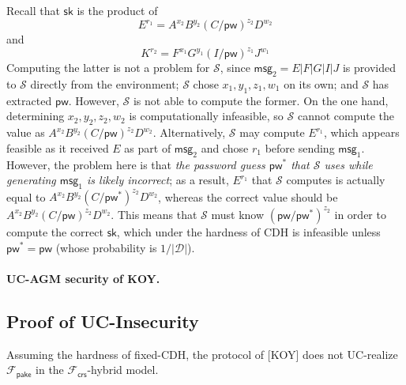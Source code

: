 \documentclass[12pt,a4paper]{article}
\newcommand{\simulator}{\mathcal{S}}
\newcommand{\sk}{\mathsf{sk}}
\newcommand{\pw}{\mathsf{pw}}
\newcommand{\msg}[1]{\mathsf{msg}_{#1}}
\begin{document}
Recall that $\sk$ is the product of
\[
E^{r_1} = A^{x_2}B^{y_2}(C/\pw)^{z_2}D^{w_2}
\]
and
\[
K^{r_2} = F^{x_1}G^{y_1}(I/\pw)^{z_1}J^{w_1}
\]
Computing the latter is not a problem for $\simulator$, since $\msg{2} = E|F|G|I|J$ is provided to $\simulator$ directly from the environment; $\simulator$ chose $x_1, y_1, z_1, w_1$ on its own; and $\simulator$ has extracted $\pw$. However, $\simulator$ is not able to compute the former. On the one hand, determining $x_2, y_2, z_2, w_2$ is computationally infeasible, so $\simulator$ cannot compute the value as $A^{x_2}B^{y_2}(C/\pw)^{z_2}D^{w_2}$. Alternatively, $\simulator$ may compute $E^{r_1}$, which appears feasible as it received $E$ as part of $\msg{2}$ and chose $r_1$ before sending $\msg{1}$. However, the problem here is that \emph{the password guess $\pw^*$ that $\simulator$ uses while generating $\msg{1}$ is likely incorrect}; as a result, $E^{r_1}$ that $\simulator$ computes is actually equal to $A^{x_2}B^{y_2}(C/\pw^*)^{z_2}D^{w_2}$, whereas the correct value should be $A^{x_2}B^{y_2}(C/\pw)^{z_2}D^{w_2}$. This means that $\simulator$ must know $(\pw/\pw^*)^{z_2}$ in order to compute the correct $\sk$, which under the hardness of CDH is infeasible unless $\pw^*=\pw$ (whose probability is $1/\mathcal{|D|}$).

\paragraph{UC-AGM security of KOY.}
	
	\subsection{Proof of UC-Insecurity}

	\begin{theorem}
		Assuming the hardness of fixed-CDH, the protocol of [KOY] does not UC-realize $\mathcal{F}_\mathsf{pake}$ in the $\mathcal{F}_{\mathsf{crs}}$-hybrid model.
	\end{theorem}
\end{document}
